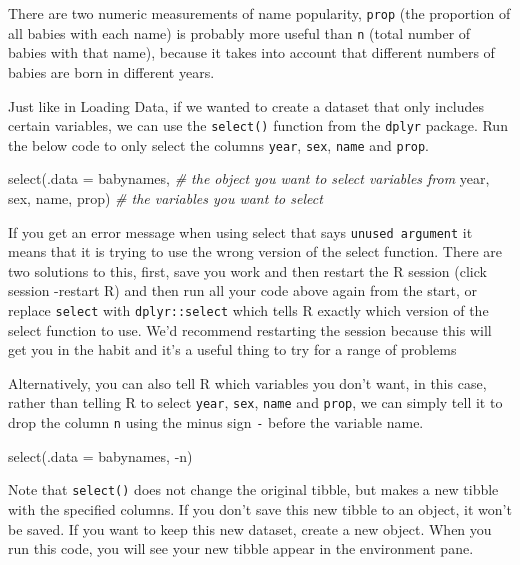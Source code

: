 \documentclass[
  oneside]{book}
\newenvironment{Shaded}{\begin{snugshade}}{\end{snugshade}}
\newcommand{\AttributeTok}[1]{\textcolor[rgb]{0.77,0.63,0.00}{#1}}
\newcommand{\CommentTok}[1]{\textcolor[rgb]{0.56,0.35,0.01}{\textit{#1}}}
\newcommand{\FunctionTok}[1]{\textcolor[rgb]{0.00,0.00,0.00}{#1}}
\newcommand{\NormalTok}[1]{#1}
\newcommand{\SpecialCharTok}[1]{\textcolor[rgb]{0.00,0.00,0.00}{#1}}
\begin{document}
There are two numeric measurements of name popularity, \texttt{prop} (the proportion of all babies with each name) is probably more useful than \texttt{n} (total number of babies with that name), because it takes into account that different numbers of babies are born in different years.

Just like in Loading Data, if we wanted to create a dataset that only includes certain variables, we can use the \texttt{select()} function from the \texttt{dplyr} package. Run the below code to only select the columns \texttt{year}, \texttt{sex}, \texttt{name} and \texttt{prop}.

\begin{Shaded}
\begin{Highlighting}[]
\FunctionTok{select}\NormalTok{(}\AttributeTok{.data =}\NormalTok{ babynames, }\CommentTok{\# the object you want to select variables from}
\NormalTok{       year, sex, name, prop) }\CommentTok{\# the variables you want to select}
\end{Highlighting}
\end{Shaded}

\begin{danger}
If you get an error message when using select that says
\texttt{unused\ argument} it means that it is trying to use the wrong
version of the select function. There are two solutions to this, first,
save you work and then restart the R session (click session -restart R)
and then run all your code above again from the start, or replace
\texttt{select} with \texttt{dplyr::select} which tells R exactly which
version of the select function to use. We'd recommend restarting the
session because this will get you in the habit and it's a useful thing
to try for a range of problems
\end{danger}

Alternatively, you can also tell R which variables you don't want, in this case, rather than telling R to select \texttt{year}, \texttt{sex}, \texttt{name} and \texttt{prop}, we can simply tell it to drop the column \texttt{n} using the minus sign \texttt{-} before the variable name.

\begin{Shaded}
\begin{Highlighting}[]
\FunctionTok{select}\NormalTok{(}\AttributeTok{.data =}\NormalTok{ babynames, }\SpecialCharTok{{-}}\NormalTok{n)}
\end{Highlighting}
\end{Shaded}

Note that \texttt{select()} does not change the original tibble, but makes a new tibble with the specified columns. If you don't save this new tibble to an object, it won't be saved. If you want to keep this new dataset, create a new object. When you run this code, you will see your new tibble appear in the environment pane.
\end{document}
